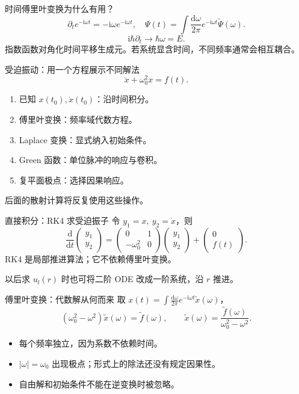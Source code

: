 \documentclass[aspectratio=169,11pt]{beamer}
\newcommand{\dd}{\mathrm d}
\newcommand{\ii}{\mathrm i}
\begin{document}
\begin{frame}{时间傅里叶变换为什么有用？}
\[
\partial_t e^{-\ii\omega t}=-\ii\omega e^{-\ii\omega t},
\quad \Psi(t)=\int\frac{\dd\omega}{2\pi}e^{-\ii\omega t}\widetilde\Psi(\omega).
\]
\[
\ii\hbar\partial_t\longrightarrow\hbar\omega=E.
\]
指数函数对角化时间平移生成元。若系统显含时间，不同频率通常会相互耦合。
\end{frame}
\begin{frame}{受迫振动：用一个方程展示不同解法}
\[
\ddot x+\omega_0^2x=f(t).
\]
\begin{enumerate}
\item 已知 $x(t_0),\dot x(t_0)$：沿时间积分。
\item 傅里叶变换：频率域代数方程。
\item Laplace 变换：显式纳入初始条件。
\item Green 函数：单位脉冲的响应与卷积。
\item 复平面极点：选择因果响应。
\end{enumerate}
后面的散射计算将反复使用这些操作。
\end{frame}
\begin{frame}{直接积分：RK4 求受迫振子}
令 $y_1=x,\ y_2=\dot x$，则
\[
\frac{\dd}{\dd t}\begin{pmatrix}y_1\\y_2\end{pmatrix}
=\begin{pmatrix}0&1\\-\omega_0^2&0\end{pmatrix}
\begin{pmatrix}y_1\\y_2\end{pmatrix}
+\begin{pmatrix}0\\f(t)\end{pmatrix}.
\]
RK4 是局部推进算法；它不依赖傅里叶变换。
\medskip

以后求 $u_l(r)$ 时也可将二阶 ODE 改成一阶系统，沿 $r$ 推进。
\end{frame}
\begin{frame}{傅里叶变换：代数解从何而来}
取 $x(t)=\int \frac{\dd\omega}{2\pi}e^{-\ii\omega t}\widetilde x(\omega)$，
\[
(\omega_0^2-\omega^2)\widetilde x(\omega)=\widetilde f(\omega),
\qquad
\widetilde x(\omega)=\frac{\widetilde f(\omega)}{\omega_0^2-\omega^2}.
\]
\begin{itemize}
\item 每个频率独立，因为系数不依赖时间。
\item $|\omega|=\omega_0$ 出现极点；形式上的除法还没有规定因果性。
\item 自由解和初始条件不能在逆变换时被忽略。
\end{itemize}
\end{frame}
\end{document}
